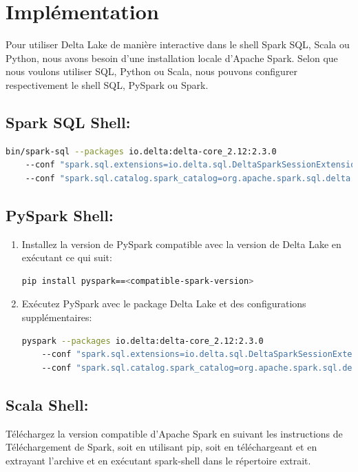 \section{Implémentation}
Pour utiliser Delta Lake de manière interactive dans le shell Spark SQL, Scala ou Python, nous avons besoin d'une installation locale d'Apache Spark. Selon que nous voulons utiliser SQL, Python ou Scala, nous pouvons configurer respectivement le shell SQL, PySpark ou Spark.

\subsection*{Spark SQL Shell:}

\begin{lstlisting}[language=bash]
    bin/spark-sql --packages io.delta:delta-core_2.12:2.3.0
    --conf "spark.sql.extensions=io.delta.sql.DeltaSparkSessionExtension"
    --conf "spark.sql.catalog.spark_catalog=org.apache.spark.sql.delta.catalog.DeltaCatalog"
\end{lstlisting}

\subsection*{PySpark Shell:}
\begin{enumerate}
    \item Installez la version de PySpark compatible avec la version de Delta Lake en exécutant ce qui suit:
    \begin{lstlisting}[language=bash]
    pip install pyspark==<compatible-spark-version>
    \end{lstlisting}
    \item Exécutez PySpark avec le package Delta Lake et des configurations supplémentaires:
    \begin{lstlisting}[language=bash]
    pyspark --packages io.delta:delta-core_2.12:2.3.0 
    --conf "spark.sql.extensions=io.delta.sql.DeltaSparkSessionExtension"
    --conf "spark.sql.catalog.spark_catalog=org.apache.spark.sql.delta.catalog.DeltaCatalog"
    \end{lstlisting}
\end{enumerate}

\subsection*{Scala Shell:}
Téléchargez la version compatible d'Apache Spark en suivant les instructions de Téléchargement de Spark, soit en utilisant pip, soit en téléchargeant et en extrayant l'archive et en exécutant spark-shell dans le répertoire extrait.


